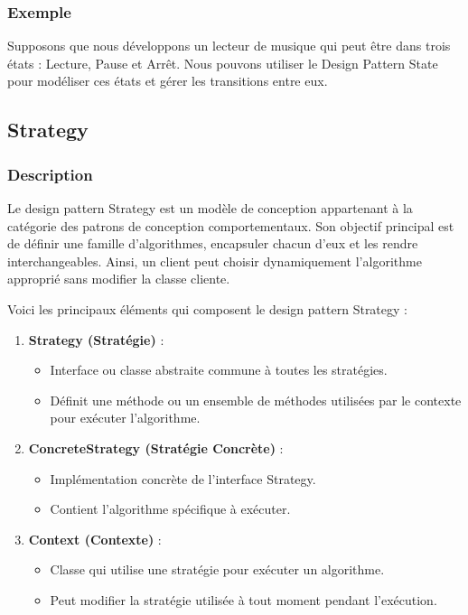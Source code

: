 \subsubsection{Exemple}

Supposons que nous développons un lecteur de musique qui peut être dans trois états : Lecture, Pause et Arrêt. Nous pouvons utiliser le Design Pattern State pour modéliser ces états et gérer les transitions entre eux.





\newpage

\subsection{Strategy}

\subsubsection{Description}

Le design pattern Strategy est un modèle de conception appartenant à la catégorie des patrons de conception comportementaux. Son objectif principal est de définir une famille d'algorithmes, encapsuler chacun d'eux et les rendre interchangeables. Ainsi, un client peut choisir dynamiquement l'algorithme approprié sans modifier la classe cliente.

Voici les principaux éléments qui composent le design pattern Strategy :

\begin{enumerate}[leftmargin=*,labelsep=3mm]
    \item \textbf{Strategy (Stratégie)} :
    \begin{itemize}
        \item Interface ou classe abstraite commune à toutes les stratégies.
        \item Définit une méthode ou un ensemble de méthodes utilisées par le contexte pour exécuter l'algorithme.
    \end{itemize}
    
    \item \textbf{ConcreteStrategy (Stratégie Concrète)} :
    \begin{itemize}
        \item Implémentation concrète de l'interface Strategy.
        \item Contient l'algorithme spécifique à exécuter.
    \end{itemize}
    
    \item \textbf{Context (Contexte)} :
    \begin{itemize}
        \item Classe qui utilise une stratégie pour exécuter un algorithme.
        \item Peut modifier la stratégie utilisée à tout moment pendant l'exécution.
    \end{itemize}
\end{enumerate}

